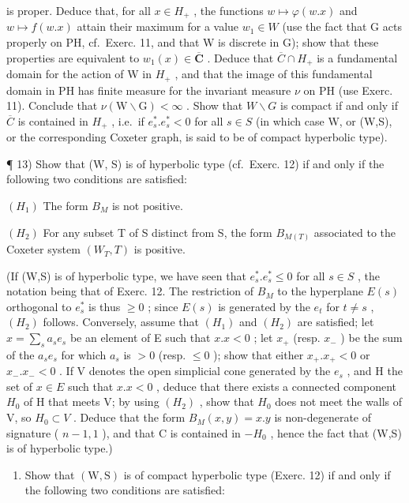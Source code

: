 is proper. Deduce that, for all \(x \in H_{+}\) , the functions \(w \mapsto \varphi(w.x)\) and \(w \mapsto f(w.x)\) attain their maximum for a value \(w_{1} \in W\) (use the fact that G acts properly on PH, cf.~Exerc. 11, and that W is discrete in G); show that these properties are equivalent to \(w_{1}(x) \in \overline{\mathbf{C}}\) . Deduce that \(\overline{C} \cap H_{+}\) is a fundamental domain for the action of W in \(H_{+}\) , and that the image of this fundamental domain in PH has finite measure for the invariant measure \(\nu\) on PH (use Exerc. 11). Conclude that \(\nu(\mathrm{W} \backslash \mathrm{G}) < \infty\) . Show that \(W \backslash G\) is compact if and only if \(\overline{C}\) is contained in \(H_{+}\) , i.e.~if \(e_{s}^{*}.e_{s}^{*} < 0\) for all \(s \in S\) (in which case W, or (W,S), or the corresponding Coxeter graph, is said to be of compact hyperbolic type).

¶ 13) Show that (W, S) is of hyperbolic type (cf.~Exerc. 12) if and only if the following two conditions are satisfied:

\((H_{1})\) The form \(B_{M}\) is not positive.

\((H_{2})\) For any subset T of S distinct from S, the form \(B_{M(T)}\) associated to the Coxeter system \((W_{T}, T)\) is positive.

(If (W,S) is of hyperbolic type, we have seen that \(e_s^*.e_s^* \leqslant 0\) for all \(s \in S\) , the notation being that of Exerc. 12. The restriction of \(B_M\) to the hyperplane \(E(s)\) orthogonal to \(e_s^*\) is thus \(\geqslant 0\) ; since \(E(s)\) is generated by the \(e_t\) for \(t \neq s\) , \((H_2)\) follows. Conversely, assume that \((H_1)\) and \((H_2)\) are satisfied; let \(x = \sum_{s} a_s e_s\) be an element of E such that \(x.x < 0\) ; let \(x_+\) (resp. \(x_-\) ) be the sum of the \(a_s e_s\) for which \(a_s\) is \(> 0\) (resp. \(\leqslant 0\) ); show that either \(x_+.x_+ < 0\) or \(x_-.x_- < 0\) . If V denotes the open simplicial cone generated by the \(e_s\) , and H the set of \(x \in E\) such that \(x.x < 0\) , deduce that there exists a connected component \(H_0\) of H that meets V; by using \((H_2)\) , show that \(H_0\) does not meet the walls of V, so \(H_0 \subset V\) . Deduce that the form \(B_M(x,y) = x.y\) is non-degenerate of signature ( \(n-1,1\) ), and that C is contained in \(-H_0\) , hence the fact that (W,S) is of hyperbolic type.)

\begin{enumerate}
\def\labelenumi{\arabic{enumi})}
\setcounter{enumi}{13}
\tightlist
\item
  Show that \((\mathrm{W},\mathrm{S})\) is of compact hyperbolic type (Exerc. 12) if and only if the following two conditions are satisfied:
\end{enumerate}

